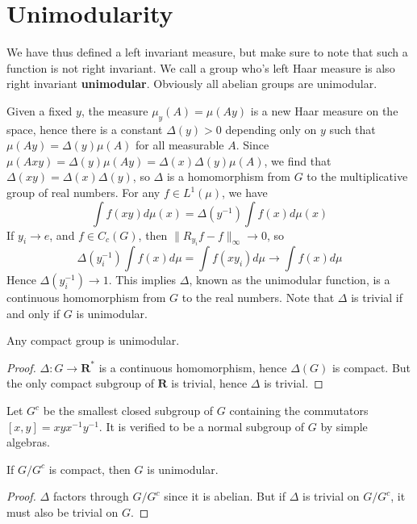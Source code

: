 \section{Unimodularity}

We have thus defined a left invariant measure, but make sure to note that such a function is not right invariant. We call a group who's left Haar measure is also right invariant {\bf unimodular}. Obviously all abelian groups are unimodular.

Given a fixed $y$, the measure $\mu_y(A) = \mu(Ay)$ is a new Haar measure on the space, hence there is a constant $\Delta(y) > 0$ depending only on $y$ such that $\mu(Ay) = \Delta(y) \mu(A)$ for all measurable $A$. Since $\mu(Axy) = \Delta(y) \mu(Ay) = \Delta(x) \Delta(y) \mu(A)$, we find that $\Delta(xy) = \Delta(x) \Delta(y)$, so $\Delta$ is a homomorphism from $G$ to the multiplicative group of real numbers. For any $f \in L^1(\mu)$, we have
%
\[ \int f(xy) d\mu(x) = \Delta(y^{-1}) \int f(x) d\mu(x)  \]
%
If $y_i \to e$, and $f \in C_c(G)$, then $\| R_{y_i} f - f \|_\infty \to 0$, so
%
\[ \Delta(y_i^{-1}) \int f(x) d\mu = \int f(xy_i) d\mu \to \int f(x) d\mu \]
%
Hence $\Delta(y_i^{-1}) \to 1$. This implies $\Delta$, known as the unimodular function, is a continuous homomorphism from $G$ to the real numbers. Note that $\Delta$ is trivial if and only if $G$ is unimodular.

\begin{theorem}
    Any compact group is unimodular.
\end{theorem}
\begin{proof}
    $\Delta: G \to \mathbf{R}^*$ is a continuous homomorphism, hence $\Delta(G)$ is compact. But the only compact subgroup of $\mathbf{R}$ is trivial, hence $\Delta$ is trivial.
\end{proof}

Let $G^c$ be the smallest closed subgroup of $G$ containing the commutators $[x,y] = xyx^{-1}y^{-1}$. It is verified to be a normal subgroup of $G$ by simple algebras.

\begin{theorem}
    If $G/G^c$ is compact, then $G$ is unimodular.
\end{theorem}
\begin{proof}
    $\Delta$ factors through $G/G^c$ since it is abelian. But if $\Delta$ is trivial on $G/G^c$, it must also be trivial on $G$.
\end{proof}

